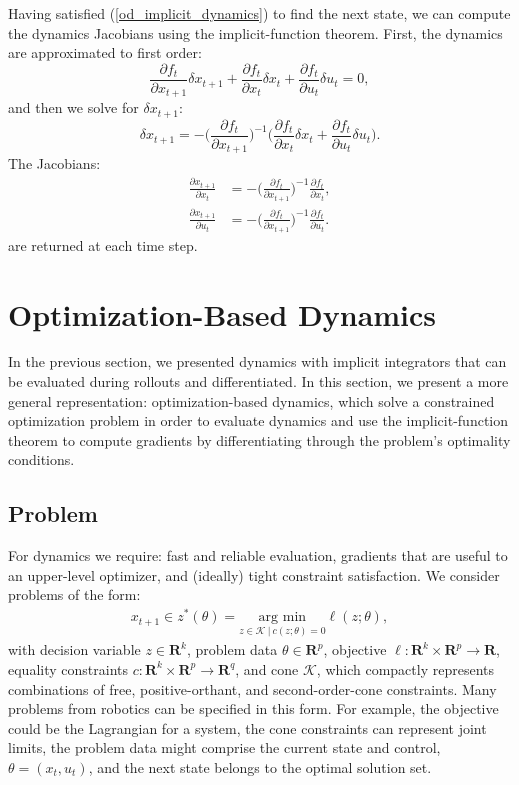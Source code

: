 Having satisfied (\ref{od_implicit_dynamics}) to find the next state, we can compute the dynamics Jacobians using the implicit-function theorem. First, the dynamics are approximated to first order:
\begin{equation}
	\frac{\partial f_t}{\partial x_{t+1}} \delta x_{t+1} + \frac{\partial f_t}{\partial x_t} \delta x_t + \frac{\partial f_t}{\partial u_t} \delta u_t  = 0,
\end{equation}
and then we solve for $\delta x_{t+1}$:
\begin{equation}
	\delta x_{t+1} = -\Big(\frac{\partial f_t}{\partial x_{t+1}}\Big)^{-1} \Big(\frac{\partial f_t}{\partial x_t} \delta x_t
	+ \frac{\partial f_t}{\partial u_t} \delta u_t \Big).
\end{equation}
The Jacobians:
\begin{align}
	\frac{\partial x_{t+1}}{\partial x_t} &= -\Big(\frac{\partial f_t}{\partial x_{t+1}}\Big)^{-1} \frac{\partial f_t}{\partial x_t}, \\
	\frac{\partial x_{t+1}}{\partial u_t} &= -\Big(\frac{\partial f_t}{\partial x_{t+1}}\Big)^{-1} \frac{\partial f_t}{\partial u_t}. \label{od_implicit_integrator_jacobians}
\end{align}
are returned at each time step.

\section{Optimization-Based Dynamics} \label{od}
In the previous section, we presented dynamics with implicit integrators that can be evaluated during rollouts and differentiated. In this section, we present a more general representation: optimization-based dynamics, which solve a constrained optimization problem in order to evaluate dynamics and use the implicit-function theorem to compute gradients by differentiating through the problem's optimality conditions.

\subsection{Problem}
For dynamics we require: fast and reliable evaluation, gradients that are useful to an upper-level optimizer, and (ideally) tight constraint satisfaction. We consider problems of the form:
\begin{align}
	x_{t+1} \in z^*(\theta) = \underset{z \in \mathcal{K} \:| \: c(z; \theta) = 0 }{\mbox{arg min}} \ell(z; \theta),
	\label{od_argmin}
\end{align}
with decision variable $z \in \mathbf{R}^k$, problem data $\theta \in \mathbf{R}^p$, objective $\ell : \mathbf{R}^k \times \mathbf{R}^p \rightarrow \mathbf{R}$, equality constraints $c : \mathbf{R}^k \times \mathbf{R}^p \rightarrow \mathbf{R}^q$, and cone $\mathcal{K}$, which compactly represents combinations of free, positive-orthant, and second-order-cone constraints. Many problems from robotics can be specified in this form. For example, the objective could be the Lagrangian for a system, the cone constraints can represent joint limits, the problem data might comprise the current state and control, $\theta = (x_t, u_t)$, and the next state belongs to the optimal solution set. 

